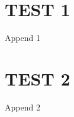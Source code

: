 \chapter{TEST 1}
\begin{subappendices} 
    Append 1
\end{subappendices}

\chapter{TEST 2}
\begin{subappendices} 
    Append 2
\end{subappendices}
